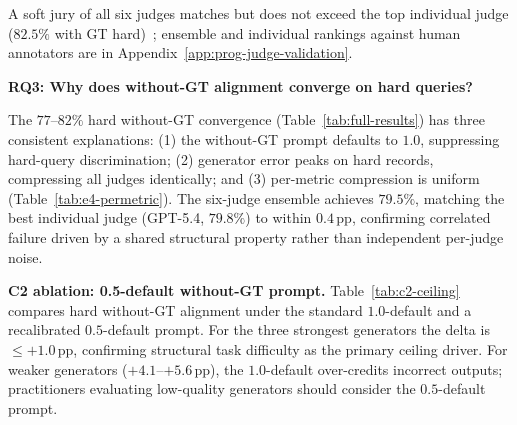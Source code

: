A soft jury of all six judges matches but does not exceed the top individual judge ($82.5\%$ with GT hard)~\citep{verga2024jury}; ensemble and individual rankings against human annotators are in Appendix~\ref{app:prog-judge-validation}.

\textbf{RQ3: Why does without-GT alignment converge on hard queries?}
\label{sec:exp:ceiling}

The $77$--$82\%$ hard without-GT convergence (Table~\ref{tab:full-results}) has three consistent explanations: (1) the without-GT prompt defaults to $1.0$, suppressing hard-query discrimination; (2) generator error peaks on hard records, compressing all judges identically; and (3) per-metric compression is uniform (Table~\ref{tab:e4-permetric}). The six-judge ensemble achieves $79.5\%$, matching the best individual judge (GPT-5.4, $79.8\%$) to within $0.4$\,pp, confirming correlated failure driven by a shared structural property rather than independent per-judge noise.

\begin{table}[t]
\centering
\small
\setlength{\tabcolsep}{5pt}
\renewcommand{\arraystretch}{1.02}

\vspace{-0.1cm}
\caption{Hard without GT alignment (\%) under the standard 1.0-default and the recalibrated 0.5-default prompts, averaged across six judges per generator. $\Delta$ = (0.5-default) $-$ (1.0-default).}
\label{tab:c2-ceiling}
\vspace{-0.5cm}
\end{table}

\textbf{C2 ablation: 0.5-default without-GT prompt.} Table~\ref{tab:c2-ceiling} compares hard without-GT alignment under the standard $1.0$-default and a recalibrated $0.5$-default prompt. For the three strongest generators the delta is ${\leq}{+1.0}$\,pp, confirming structural task difficulty as the primary ceiling driver. For weaker generators ($+4.1$--$+5.6$\,pp), the $1.0$-default over-credits incorrect outputs; practitioners evaluating low-quality generators should consider the $0.5$-default prompt.

